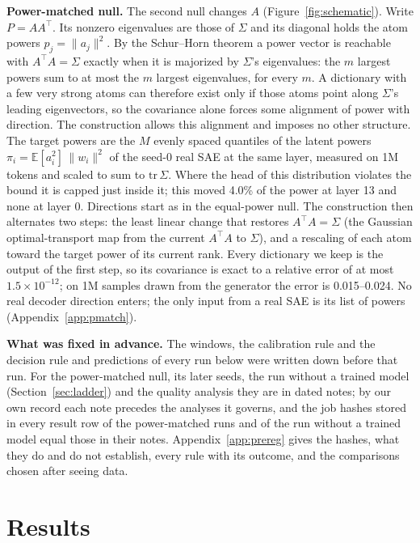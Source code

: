 \documentclass[10pt,twocolumn]{article}
\newcommand{\Sig}{\Sigma}
\begin{document}
\textbf{Power-matched null.} The second null changes $A$ (Figure~\ref{fig:schematic}). Write $P = AA^\top$. Its nonzero eigenvalues are those of $\Sig$ and its diagonal holds the atom powers $p_j = \|a_j\|^2$. By the Schur--Horn theorem a power vector is reachable with $A^\top A = \Sig$ exactly when it is majorized by $\Sig$'s eigenvalues: the $m$ largest powers sum to at most the $m$ largest eigenvalues, for every $m$. A dictionary with a few very strong atoms can therefore exist only if those atoms point along $\Sig$'s leading eigenvectors, so the covariance alone forces some alignment of power with direction. The construction allows this alignment and imposes no other structure. The target powers are the $M$ evenly spaced quantiles of the latent powers $\pi_i = \mathbb{E}[a_i^2]\,\|w_i\|^2$ of the seed-0 real SAE at the same layer, measured on 1M tokens and scaled to sum to $\mathrm{tr}\,\Sig$. Where the head of this distribution violates the bound it is capped just inside it; this moved 4.0\% of the power at layer 13 and none at layer 0. Directions start as in the equal-power null. The construction then alternates two steps: the least linear change that restores $A^\top A=\Sig$ (the Gaussian optimal-transport map from the current $A^\top A$ to $\Sig$), and a rescaling of each atom toward the target power of its current rank. Every dictionary we keep is the output of the first step, so its covariance is exact to a relative error of at most $1.5\times 10^{-12}$; on 1M samples drawn from the generator the error is 0.015--0.024. No real decoder direction enters; the only input from a real SAE is its list of powers (Appendix~\ref{app:pmatch}).

\textbf{What was fixed in advance.} The windows, the calibration rule and the decision rule and predictions of every run below were written down before that run. For the power-matched null, its later seeds, the run without a trained model (Section~\ref{sec:ladder}) and the quality analysis they are in dated notes; by our own record each note precedes the analyses it governs, and the job hashes stored in every result row of the power-matched runs and of the run without a trained model equal those in their notes. Appendix~\ref{app:prereg} gives the hashes, what they do and do not establish, every rule with its outcome, and the comparisons chosen after seeing data.

\section{Results}
\end{document}
